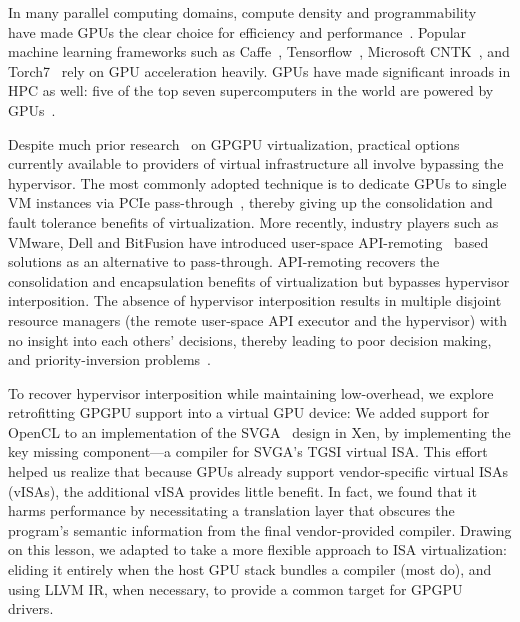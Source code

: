 
In many parallel computing domains, compute density and
programmability~\cite{nvidia_cuda, stone2010opencl, gregory2014c++} have
made GPUs the clear choice for efficiency and performance~\cite{gpu_apps}.
Popular machine learning frameworks such as Caffe~\cite{jia2014caffe},
Tensorflow~\cite{abadi2016tensorflow}, Microsoft CNTK~\cite{yu2014cntk},
and Torch7~\cite{collobert2011torch7} rely on GPU acceleration heavily.
GPUs have made significant inroads in HPC as well: five of the top seven
supercomputers in the world are powered by GPUs~\cite{top500-Nov2018}.

Despite much prior research~\cite{rossbach16vee, kaveri16vee,
cc-numa-gpu-hpca15, abhishek-ispass16} on GPGPU virtualization, practical
options currently available to providers of virtual infrastructure all involve
bypassing the hypervisor. The most commonly adopted technique is to dedicate
GPUs to single VM instances via PCIe pass-through~\cite{AWS-gpu,gVirt},
thereby giving up the consolidation and fault tolerance benefits of
virtualization. More recently, industry players such as VMware, Dell and
BitFusion have introduced user-space API-remoting~\cite{bitfusion-whitepaper,
kim2012snucl, rCUDAnew, vmCUDA,rCUDA} based solutions as an alternative to
pass-through. API-remoting recovers the consolidation and encapsulation
benefits of virtualization but bypasses hypervisor interposition. The absence
of hypervisor interposition results in multiple disjoint resource managers
(the remote user-space API executor and the hypervisor) with no insight into
each others' decisions, thereby leading to poor decision making, and
priority-inversion problems~\cite{rossbach2011ptask}.

To recover hypervisor interposition while maintaining low-overhead, we explore
retrofitting GPGPU support into a virtual GPU device: We added support for
OpenCL to an implementation of the SVGA~\cite{dowty2009gpu} design in Xen, by
implementing the key missing component---a compiler for SVGA's TGSI virtual
ISA.
This effort helped us realize that because GPUs already support vendor-specific
virtual ISAs (vISAs), the additional vISA provides little benefit.
In fact, we found that it harms performance by necessitating a translation
layer that obscures the program's semantic information from the final
vendor-provided compiler.
Drawing on this lesson, we adapted \Trillium to take a more flexible approach
to ISA virtualization: eliding it entirely when the host GPU stack bundles a
compiler (most do), and using LLVM IR, when necessary, to provide a common
target for GPGPU drivers.

